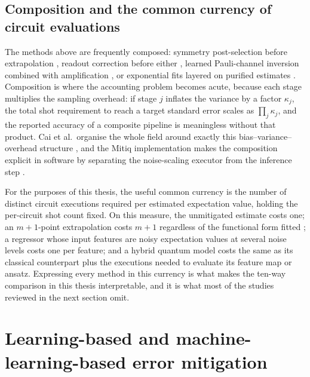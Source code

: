 \documentclass[Thesis.tex]{subfiles}
\begin{document}
\subsection{Composition and the common currency of circuit evaluations}

The methods above are frequently composed: symmetry post-selection before
extrapolation \cite{bonetmonroig2018symmetry}, readout correction before
either \cite{nation2021scalable}, learned Pauli-channel inversion combined
with amplification \cite{kim2023utility}, or exponential fits layered on
purified estimates \cite{huggins2021virtual}. Composition is where the
accounting problem becomes acute, because each stage multiplies the sampling
overhead: if stage $j$ inflates the variance by a factor $\kappa_{j}$, the
total shot requirement to reach a target standard error scales as
$\prod_{j}\kappa_{j}$, and the reported accuracy of a composite pipeline is
meaningless without that product. Cai et al.\ organise the whole field around
exactly this bias--variance--overhead structure \cite{cai2023review}, and the
Mitiq implementation makes the composition explicit in software by
separating the noise-scaling executor from the inference step
\cite{larose2022mitiq}.

For the purposes of this thesis, the useful common currency is the number of
distinct circuit executions required per estimated expectation value, holding
the per-circuit shot count fixed. On this measure, the unmitigated estimate
costs one; an $m+1$-point extrapolation costs $m+1$ regardless of the
functional form fitted \cite{endo2018practical,cai2021multiexponential}; a
regressor whose input features are noisy expectation values at several noise
levels costs one per feature; and a hybrid quantum model costs the same as its
classical counterpart plus the executions needed to evaluate its feature map
or ansatz. Expressing every method in this currency is what makes the ten-way
comparison in this thesis interpretable, and it is what most of the studies
reviewed in the next section omit.

\section{Learning-based and machine-learning-based error mitigation}\label{sec2:mlqem}
\end{document}
